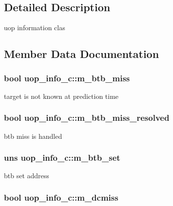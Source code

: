 \subsection{Detailed Description}
uop information clas 

\subsection{Member Data Documentation}
\hypertarget{classuop__info__c_a231581e8274014ca0eee3503645e2c96}{
\subsubsection[{m\_\-btb\_\-miss}]{\setlength{\rightskip}{0pt plus 5cm}bool {\bf uop\_\-info\_\-c::m\_\-btb\_\-miss}}}
\label{classuop__info__c_a231581e8274014ca0eee3503645e2c96}
target is not known at prediction time \hypertarget{classuop__info__c_abe0421cd826cb800793f16eaf1806eb1}{
\subsubsection[{m\_\-btb\_\-miss\_\-resolved}]{\setlength{\rightskip}{0pt plus 5cm}bool {\bf uop\_\-info\_\-c::m\_\-btb\_\-miss\_\-resolved}}}
\label{classuop__info__c_abe0421cd826cb800793f16eaf1806eb1}
btb miss is handled \hypertarget{classuop__info__c_a2417e1507b9da6996274504e220655c0}{
\subsubsection[{m\_\-btb\_\-set}]{\setlength{\rightskip}{0pt plus 5cm}uns {\bf uop\_\-info\_\-c::m\_\-btb\_\-set}}}
\label{classuop__info__c_a2417e1507b9da6996274504e220655c0}
btb set address \hypertarget{classuop__info__c_ad554638974bb5d439d74557a13d3aa71}{
\subsubsection[{m\_\-dcmiss}]{\setlength{\rightskip}{0pt plus 5cm}bool {\bf uop\_\-info\_\-c::m\_\-dcmiss}}}

